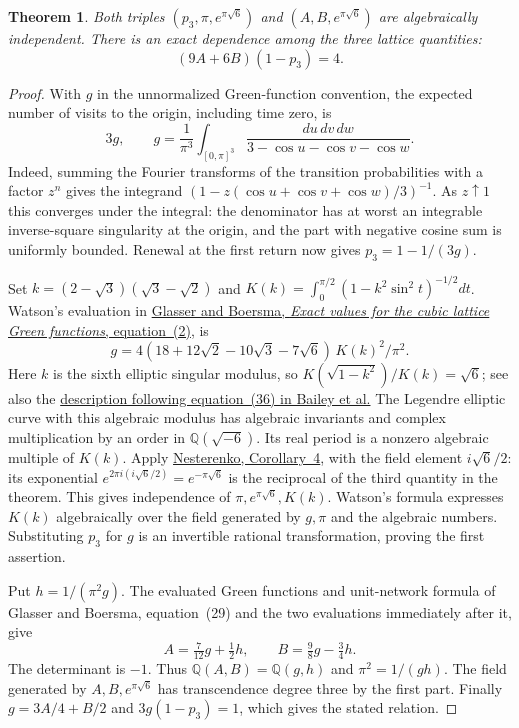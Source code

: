 \documentclass[11pt,a4paper]{article}
\newtheorem{theorem}{Theorem}[section]
\theoremstyle{definition}\newtheorem{definition}[theorem]{Definition}\newtheorem{example}[theorem]{Example}
\theoremstyle{remark}\newtheorem{remark}[theorem]{Remark}
\newcommand{\Q}{\mathbb Q}\newcommand{\Z}{\mathbb Z}\newcommand{\R}{\mathbb R}\newcommand{\N}{\mathbb N}
\begin{document}
\begin{theorem}\label{thm:cubic-period-recovery}
Both triples $(p_3,\pi,e^{\pi\sqrt6})$ and $(A,B,e^{\pi\sqrt6})$ are
algebraically independent. There is an exact dependence among the three
lattice quantities:
\[
 (9A+6B)(1-p_3)=4.
\]
\end{theorem}
\begin{proof}
With $g$ in the unnormalized Green-function convention, the expected number
of visits to the origin, including time zero, is
\[
 3g,\qquad g=\frac1{\pi^3}\int_{[0,\pi]^3}
 \frac{du\,dv\,dw}{3-\cos u-\cos v-\cos w}.
\]
Indeed, summing the Fourier transforms of the transition probabilities with
a factor $z^n$ gives the integrand $(1-z(\cos u+\cos v+\cos w)/3)^{-1}$.
As $z\uparrow1$ this converges under the integral: the denominator has at
worst an integrable inverse-square singularity at the origin, and the part
with negative cosine sum is uniformly bounded. Renewal at the first return
now gives $p_3=1-1/(3g)$.

Set $k=(2-\sqrt3)(\sqrt3-\sqrt2)$ and
$K(k)=\int_0^{\pi/2}(1-k^2\sin^2 t)^{-1/2}dt$. Watson's evaluation in
\href{https://doi.org/10.1088/0305-4470/33/28/306}{Glasser and Boersma,
\emph{Exact values for the cubic lattice Green functions}, equation~(2)}, is
\[
 g=4(18+12\sqrt2-10\sqrt3-7\sqrt6)\,K(k)^2/\pi^2.
\]
Here $k$ is the sixth elliptic singular modulus, so
$K(\sqrt{1-k^2})/K(k)=\sqrt6$; see also the
\href{https://www.davidhbailey.com/dhbpapers/tenproblems.pdf}{description
following equation~(36) in Bailey et al.} The Legendre elliptic curve with
this algebraic modulus has algebraic invariants and complex multiplication
by an order in $\Q(\sqrt{-6})$. Its real period is a nonzero algebraic
multiple of $K(k)$. Apply
\href{https://doi.org/10.1070/SM1996v187n09ABEH000158}{Nesterenko,
Corollary~4}, with the field element $i\sqrt6/2$: its exponential
$e^{2\pi i(i\sqrt6/2)}=e^{-\pi\sqrt6}$ is the reciprocal of the third
quantity in the theorem. This gives independence of $\pi,e^{\pi\sqrt6},K(k)$.
Watson's formula expresses $K(k)$ algebraically over the field generated
by $g,\pi$ and the algebraic numbers. Substituting $p_3$ for $g$ is an
invertible rational transformation, proving the first assertion.

Put $h=1/(\pi^2g)$. The evaluated Green functions and unit-network formula
of Glasser and Boersma, equation~(29) and the two evaluations immediately
after it, give
\[
 A=\tfrac7{12}g+\tfrac12h,\qquad B=\tfrac98g-\tfrac34h.
\]
The determinant is $-1$. Thus $\Q(A,B)=\Q(g,h)$ and $\pi^2=1/(gh)$.
The field generated by $A,B,e^{\pi\sqrt6}$ has transcendence degree three
by the first part. Finally $g=3A/4+B/2$ and $3g(1-p_3)=1$, which gives
the stated relation.
\end{proof}
\end{document}
